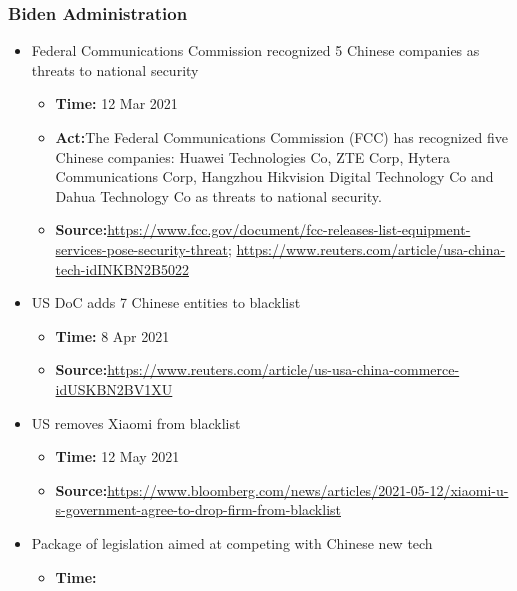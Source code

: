 		\subsubsection{Biden Administration}
			\begin{itemize}
			\item Federal Communications Commission recognized 5 Chinese companies as threats to national security
				\begin{itemize}
				\item \textbf{Time:} 12 Mar 2021
				\item \textbf{Act:}The Federal Communications Commission (FCC) has recognized five Chinese companies: Huawei Technologies Co, ZTE Corp, Hytera Communications Corp, Hangzhou Hikvision Digital Technology Co and Dahua Technology Co as threats to national security.
				\item \textbf{Source:}\url{https://www.fcc.gov/document/fcc-releases-list-equipment-services-pose-security-threat}; \url{https://www.reuters.com/article/usa-china-tech-idINKBN2B5022}
				\end{itemize}
				
			\item US DoC adds 7 Chinese entities to blacklist
				\begin{itemize}
				\item \textbf{Time:} 8 Apr 2021
				\item \textbf{Source:}\url{https://www.reuters.com/article/us-usa-china-commerce-idUSKBN2BV1XU}
				\end{itemize}
				
			\item US removes Xiaomi from blacklist
				\begin{itemize}
				\item \textbf{Time:} 12 May 2021
				\item \textbf{Source:}\url{https://www.bloomberg.com/news/articles/2021-05-12/xiaomi-u-s-government-agree-to-drop-firm-from-blacklist}
				\end{itemize}
				
			\item Package of legislation aimed at competing with Chinese new tech
				\begin{itemize}
				\item \textbf{Time:} 
				\end{itemize}
				

\end{itemize}
